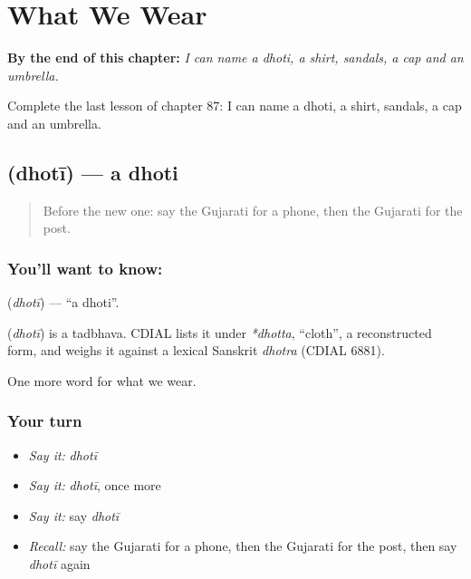 
\chapter{What We Wear}
\label{ch:gu-what-we-wear}

\begin{chapteropening}
\textbf{By the end of this chapter:} \emph{I can name a dhoti, a shirt, sandals, a cap and an umbrella.}

Complete the last lesson of chapter 87: I can name a dhoti, a shirt, sandals, a cap and an umbrella.
\end{chapteropening}

\section[\texorpdfstring{\gu{ધોતી} (dhotī)}{ધોતી (dhotī)}]{ (dhotī) — a dhoti}

\label{lesson:GU-C87-dhoti}



\begin{quote}
Before the new one: say the Gujarati for a phone, then the Gujarati for the post.
\end{quote}

\subsection*{You'll want to know: }
\textbf{} (\emph{dhotī}) — \textquotedblleft{}a dhoti\textquotedblright{}.

\begin{cousinweb}
\textbf{} (\emph{dhotī}) is a tadbhava. CDIAL lists it under \emph{*dhotta}, \textquotedblleft{}cloth\textquotedblright{}, a reconstructed form, and weighs it against a lexical Sanskrit \emph{dhotra} (CDIAL 6881).
\end{cousinweb}

\begin{grammarlens}[title={What you've built}]
One more word for what we wear.
\end{grammarlens}

\subsection*{Your turn}
\begin{itemize}
\raggedright
  \item \emph{Say it:} \emph{dhotī}
  \item \emph{Say it:} \emph{dhotī}, once more
  \item \emph{Say it:} say \emph{dhotī}
  \item \emph{Recall:} say the Gujarati for a phone, then the Gujarati for the post, then say \emph{dhotī} again
\end{itemize}


